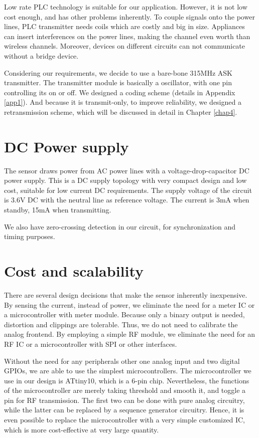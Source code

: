Low rate PLC technology is suitable for our application. However, it is not low cost enough, and has other problems inherently. To couple signals onto the power lines, PLC transmitter needs coils which are costly and big in size. Appliances can insert interferences on the power lines, making the channel even worth than wireless channels. Moreover, devices on different circuits can not communicate without a bridge device. 

Considering our requirements, we decide to use a bare-bone 315MHz ASK transmitter. The transmitter module is basically a oscillator, with one pin controlling its on or off. We designed a coding scheme (details in Appendix \ref{app1}). And because it is transmit-only, to improve reliability, we designed a retransmission scheme, which will be discussed in detail in Chapter \ref{chap4}. 

\section{DC Power supply}

The sensor draws power from AC power lines with a voltage-drop-capacitor DC power supply. This is a DC supply topology with very compact design and low cost, suitable for low current DC requirements. The supply voltage of the circuit is 3.6V DC with the neutral line as reference voltage. The current is 3mA when standby, 15mA when transmitting. 

We also have zero-crossing detection in our circuit, for synchronization and timing purposes. 

\section{Cost and scalability}

There are several design decisions that make the sensor inherently inexpensive. By sensing the current, instead of power, we eliminate the need for a meter IC or a microcontroller with meter module. Because only a binary output is needed, distortion and clippings are tolerable. Thus, we do not need to calibrate the analog frontend. By employing a simple RF module, we eliminate the need for an RF IC or a microcontroller with SPI or other interfaces. 

Without the need for any peripherals other one analog input and two digital GPIOs, we are able to use the simplest microcontrollers. The microcontroller we use in our design is ATtiny10, which is a 6-pin chip. Nevertheless, the functions of the microcontroller are merely taking threshold and smooth it, and toggle a pin for RF transmission. The first two can be done with pure analog circuitry, while the latter can be replaced by a sequence generator circuitry. Hence, it is even possible to replace the microcontroller with a very simple customized IC, which is more cost-effective at very large quantity. 


